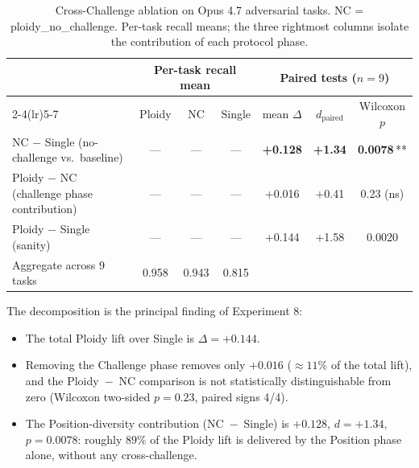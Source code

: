 \documentclass[11pt]{article}
\begin{document}
\begin{table}[t]
\centering
\caption{Cross-Challenge ablation on Opus 4.7 adversarial tasks. NC = ploidy\_no\_challenge. Per-task recall means; the three rightmost columns isolate the contribution of each protocol phase.}
\label{tab:cross-challenge}
\small
\begin{tabular}{l c c c c c c}
\toprule
& \multicolumn{3}{c}{Per-task recall mean} & \multicolumn{3}{c}{Paired tests ($n{=}9$)} \\
\cmidrule(lr){2-4}\cmidrule(lr){5-7}
& Ploidy & NC & Single & mean $\Delta$ & $d_\text{paired}$ & Wilcoxon $p$ \\
\midrule
NC $-$ Single (no-challenge vs.\ baseline) & --- & --- & --- & \textbf{+0.128} & \textbf{+1.34} & \textbf{0.0078}\,** \\
Ploidy $-$ NC (challenge phase contribution) & --- & --- & --- & +0.016 & +0.41 & 0.23 (ns) \\
Ploidy $-$ Single (sanity) & --- & --- & --- & +0.144 & +1.58 & 0.0020 \\
\midrule
Aggregate across 9 tasks & 0.958 & 0.943 & 0.815 & & & \\
\bottomrule
\end{tabular}
\end{table}

The decomposition is the principal finding of Experiment 8:

\begin{itemize}
  \item The total Ploidy lift over Single is $\Delta = +0.144$.
  \item Removing the Challenge phase removes only $+0.016$
        ($\approx 11\%$ of the total lift), and the Ploidy~$-$~NC
        comparison is not statistically distinguishable from zero
        (Wilcoxon two-sided $p = 0.23$, paired signs 4/4).
  \item The Position-diversity contribution
        (NC~$-$~Single) is $+0.128$, $d = +1.34$, $p = 0.0078$:
        roughly $89\%$ of the Ploidy lift is delivered by the
        Position phase alone, without any cross-challenge.
\end{itemize}
\end{document}
